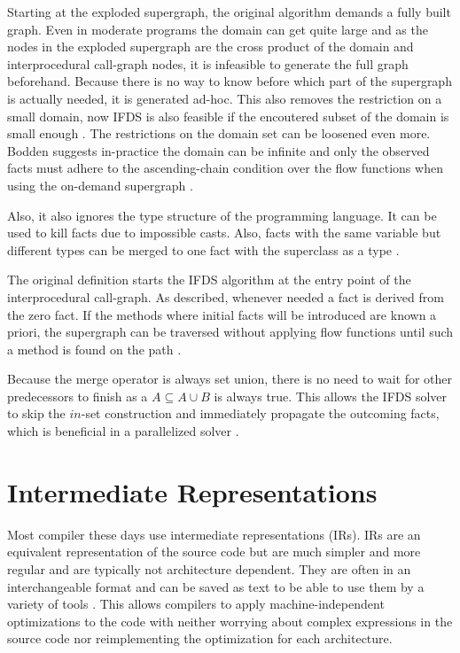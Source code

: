 \documentclass[../draft.tex]{subfiles}
\begin{document}
    Starting at the exploded supergraph, the original algorithm demands a fully built graph. Even in moderate programs the domain can get quite large and as the nodes in the exploded supergraph are the cross product of the domain and interprocedural call-graph nodes, it is infeasible to generate the full graph beforehand. Because there is no way to know before which part of the supergraph is actually needed, it is generated ad-hoc. This also removes the restriction on a small domain, now IFDS is also feasible if the encoutered subset of the domain is small enough \cite{Naeem2010}.
    The restrictions on the domain set can be loosened even more. Bodden suggests in-practice the domain can be infinite and only the observed facts must adhere to the ascending-chain condition over the flow functions when using the on-demand supergraph \cite{Bodden2012}.
    
    Also, it also ignores the type structure of the programming language. It can be used to kill facts due to impossible casts. Also, facts with the same variable but different types can be merged to one fact with the superclass as a type \cite{Naeem2010}.

    The original definition starts the IFDS algorithm at the entry point of the interprocedural call-graph. As described, whenever needed a fact is derived from the zero fact. If the methods where initial facts will be introduced are known a priori, the supergraph can be traversed without applying flow functions until such a method is found on the path \cite{Arzt2017PhD}.  

    Because the merge operator is always set union, there is no need to wait for other predecessors to finish as a $A \subseteq A \cup B$ is always true. This allows the IFDS solver to skip the $in$-set construction and immediately propagate the outcoming facts, which is beneficial in a parallelized solver \cite{Arzt2017PhD}.


    \section{Intermediate Representations}\label{s:jimple}
    Most compiler these days use intermediate representations (IRs). IRs are an equivalent representation of the source code but are much simpler and more regular and are typically not architecture dependent. They are often in an interchangeable format and can be saved as text to be able to use them by a variety of tools \cite{Thain2019}.
    This allows compilers to apply machine-independent optimizations to the code with neither worrying about complex expressions in the source code nor reimplementing the optimization for each architecture. 
\end{document}

